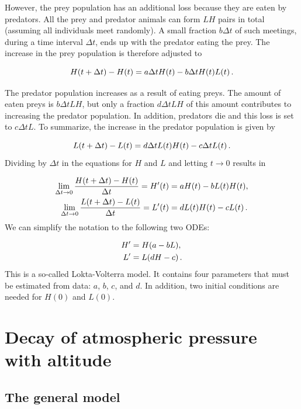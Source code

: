 \documentclass[%
oneside,                 %
final,                   %
10pt]{article}
\begin{document}
However, the prey population has an additional loss because they
are eaten by predators. All the prey and predator animals can form
$LH$ pairs in total (assuming all individuals meet randomly).
A small fraction $b\Delta t$
of such meetings, during a time interval $\Delta t$,
ends up with the predator eating the prey. The increase in the prey
population is therefore adjusted to

\[ H(t+\Delta t) - H(t) =  a\Delta t H(t) - b\Delta t H(t)L(t)\tp\]

The predator population increases as a result of eating preys.
The amount of eaten preys is $b\Delta t LH$, but only a fraction
$d\Delta t LH$ of this amount contributes to increasing the
predator population. In addition, predators die and this loss
is set to $c\Delta t L$. To summarize, the increase in the predator
population is given by

\[ L(t + \Delta t) - L(t) = d\Delta t L(t)H(t) - c\Delta t L(t)\tp\]
Dividing by $\Delta t$ in the equations for $H$ and $L$ and letting
$t\rightarrow 0$ results in

\begin{align*}
\lim_{\Delta t\rightarrow 0}\frac{H(t+\Delta t)-H(t)}{\Delta t}
= H^{\prime}(t) &= aH(t) - bL(t)H(t),\\ 
\lim_{\Delta t\rightarrow 0}\frac{L(t+\Delta t)-L(t)}{\Delta t}
= L^{\prime}(t) &= dL(t)H(t) - cL(t)\tp
\end{align*}
We can simplify the notation to the following two ODEs:

\begin{align}
H^{\prime} &= H(a - bL),
\label{decay:app:predprey:eqH}\\ 
L^{\prime} &= L(dH - c)\tp
\label{decay:app:predprey:eqL}
\end{align}
This is a so-called Lokta-Volterra model. It contains four parameters
that must be estimated from data: $a$, $b$, $c$, and $d$. In addition, two
initial conditions are needed for $H(0)$ and $L(0)$.

\section{Decay of atmospheric pressure with altitude}
\label{decay:app:atm}


\subsection{The general model}
\end{document}

